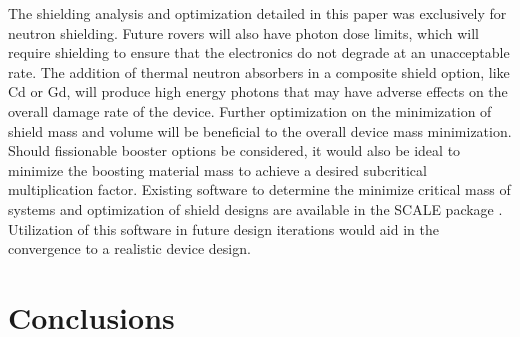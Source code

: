 \documentclass{mc2015}
\begin{document}
The shielding analysis and optimization detailed in this paper was exclusively for neutron shielding. Future rovers will also have photon dose limits, which will require shielding to ensure that the electronics do not degrade at an unacceptable rate. The addition of thermal neutron absorbers in a composite shield option, like Cd or Gd, will produce high energy photons that may have adverse effects on the overall damage rate of the device. 
Further optimization on the minimization of shield mass and volume will be beneficial to the overall device mass minimization. Should fissionable booster options be considered, it would also be ideal to minimize the boosting material mass to achieve a desired subcritical multiplication factor. Existing software to determine the minimize critical mass \cite{goluoglu_smoresnew_2002,karni_semi-automated_keff,karni_smores_2003} of systems and optimization of shield designs \cite{greenspan_material_1994,greenspan_swans:_2001} are available in the SCALE package \cite{bowman_scale_2003}. Utilization of this software in future design iterations would aid in the convergence to a realistic device design.  

\section{Conclusions}
\label{sec:conclusions}
\end{document}
